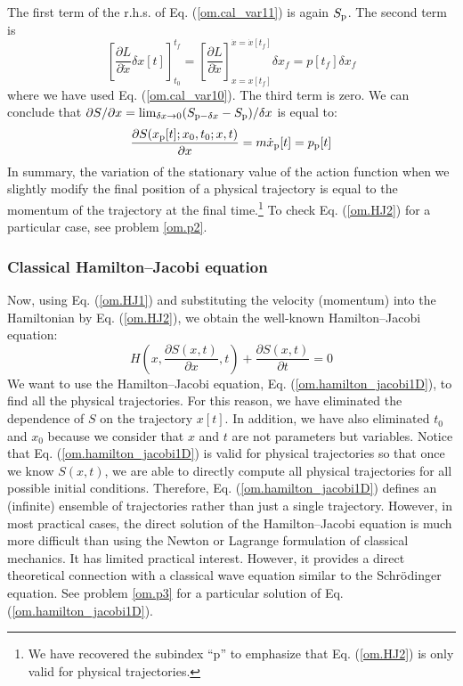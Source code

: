 \documentclass[nofootinbib, secnumarabic, amsmath, nobibnotes,11pt,aps,pra, floatfix]{revtex4-1}
\newcommand{\eref}[1]{Eq. (\ref{#1})}
\begin{document}
\noindent The first term of the r.h.s. of \eref{om.cal_var11} is again $S_{\rm p}$. The second term is
\begin{equation}
\label{om.cal_var12}
\left[ \frac {\partial L} {\partial \dot{x}} \delta x[t] \right]_{t_0}^{t_f} = \left[ \frac {\partial L} {\partial \dot{x}} \right]_{x = x[t_f]}^{\dot{x} = \dot{x}[t_f]} \delta x_f = p[t_f] \delta x_f
\end{equation}
where we have used \eref{om.cal_var10}. The third term is zero. We can conclude that ${\partial S}/{\partial x} = \lim_{\delta x \rightarrow 0}(S_{{\rm p} - \delta x} - S_{\rm p})/\delta x$ is equal to:
\begin{equation}
\label{om.HJ2}
\frac{\partial S(x_{\rm p}[t];x_0,t_0;x,t)} {\partial x} = m \dot{x}_{\rm p}[t] = p_{\rm p}[t]
\end{equation}
In summary, the variation of the stationary value of the action
function when we slightly modify the final position of a physical
trajectory is equal to the momentum of the trajectory at the final
time.\footnote{We have recovered the subindex ``p'' to emphasize that
\eref{om.HJ2} is only valid for physical trajectories.} To check
\eref{om.HJ2} for a particular case, see problem \ref{om.p2}.


\subsubsection{Classical Hamilton--Jacobi equation}

Now, using \eref{om.HJ1} and substituting the velocity (momentum) into
the Hamiltonian by \eref{om.HJ2}, we  obtain the well-known
Hamilton--Jacobi equation:
\begin{equation}
\label{om.hamilton_jacobi1D}
H\left(x,\frac{\partial S(x,t)}{\partial x},t \right) + \frac{\partial S(x,t)}{\partial t} = 0
\end{equation}
We want to use the Hamilton--Jacobi equation,
\eref{om.hamilton_jacobi1D}, to find all the physical trajectories.
For this reason,  we have eliminated
the dependence of $S$ on the trajectory $x[t]$. In addition, we have
also eliminated $t_0$ and $x_0$ because we consider that $x$ and $t$
are not parameters but variables. Notice that
\eref{om.hamilton_jacobi1D} is valid for physical trajectories so
that once we know $S(x,t)$, we are able to directly compute all
physical trajectories for all possible initial conditions.
Therefore, \eref{om.hamilton_jacobi1D} defines an (infinite)
ensemble of trajectories rather than just a single trajectory.
However, in most practical cases, the direct solution of the
Hamilton--Jacobi equation is much more difficult than using the Newton or
Lagrange formulation of classical mechanics. It has limited
practical interest. However, it provides a direct theoretical
connection with a classical wave equation similar to the
Schr\"odinger equation. See problem \ref{om.p3} for a particular
solution of \eref{om.hamilton_jacobi1D}.
\end{document}
